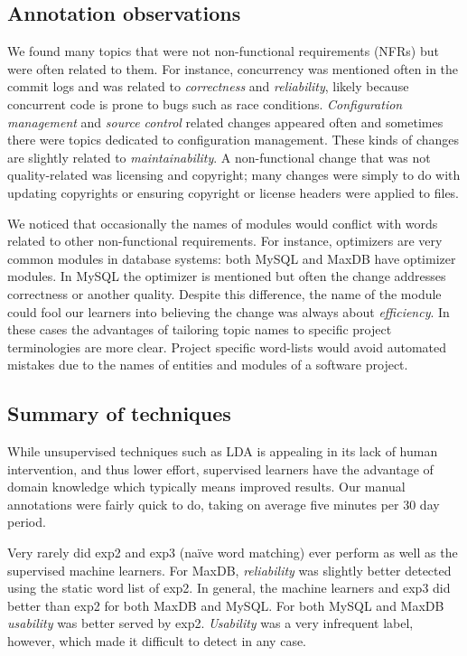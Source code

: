 \documentclass[]{sig-alternate}
\begin{document}
\subsection{Annotation observations}
We found many topics that were not non-functional requirements (NFRs) but were often related to them. 
For instance, concurrency was mentioned often in the commit logs and was related to \emph{correctness} and \emph{reliability}, likely because concurrent code is prone to bugs such as race conditions.%
\emph{Configuration management} and \emph{source control} related changes appeared often and sometimes there were topics dedicated to configuration management. 
These kinds of changes are slightly related to \emph{maintainability}. 
A non-functional change that was not quality-related was licensing and copyright; many changes were simply to do with updating copyrights or ensuring copyright or license headers were applied to files.

We noticed that occasionally the names of modules would conflict with words related to other non-functional requirements. 
For instance, optimizers are very common modules in database systems: both MySQL and MaxDB have optimizer modules. 
In MySQL the optimizer is mentioned but often the change addresses  correctness or another quality. 
Despite this difference, the name of the module could fool our learners into believing the change was always about \emph{efficiency}. 
In these cases the advantages of tailoring topic names to specific project terminologies are more clear. 
Project specific word-lists would avoid automated mistakes due to the names of entities and modules of a software project.

\subsection{Summary of techniques}
While unsupervised techniques such as LDA is appealing in its lack of human intervention, and thus lower effort, 
supervised learners have the advantage of domain knowledge which typically means improved results. 
Our manual annotations were fairly quick to do, taking on average five minutes per 30 day period. 

Very rarely did \textsf{exp2} and \textsf{exp3} (naïve word matching) ever perform as well as the supervised machine learners. 
For MaxDB, \textit{reliability} was slightly better detected using the static word list of \textsf{exp2}. 
In general, the machine learners and \textsf{exp3} did better than \textsf{exp2} for both MaxDB and MySQL. 
For both MySQL and MaxDB \textit{usability} was better served by \textsf{exp2}. 
\textit{Usability} was a very infrequent label, however, which made it difficult to detect in any case.
\end{document}

